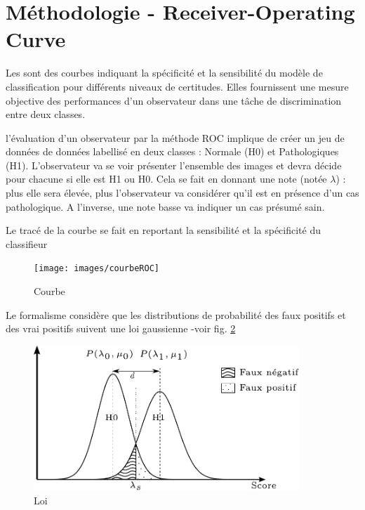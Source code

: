 	\section{Méthodologie \ROC - Receiver-Operating Curve}

Les \ROC sont des courbes indiquant la spécificité et la sensibilité du modèle de classification pour différents niveaux de certitudes. Elles fournissent une mesure objective des performances d'un observateur dans une tâche de discrimination entre deux classes. 

l'évaluation d'un observateur par la méthode ROC implique de créer un jeu de données de données labellisé en deux classes : Normale (H0) et Pathologiques (H1). L'observateur va se voir présenter l'ensemble des images et devra décide pour chacune si elle est H1 ou H0. Cela se fait en donnant une note (notée $\lambda$) : plus elle sera élevée, plus l'observateur va considérer qu'il est en présence d'un cas pathologique. A l'inverse, une note basse va indiquer un cas présumé sain.

Le tracé de la courbe \ROC se fait en reportant la sensibilité et la spécificité du classifieur 
\begin{figure}[h]
	
	\label{fig:courbeROC}
	\begin{center}
	\texttt{[image: images/courbeROC]}
	\end{center}
	\caption{Courbe \ROC}
\end{figure}

Le formalisme \ROC considère que les distributions de probabilité des faux positifs et des vrai positifs suivent une loi gaussienne -voir fig. \ref{fig:loiROC}

\begin{figure}[h]
	
	\label{fig:loiROC}
	\begin{center}
	\includegraphics[width=10cm]{images/loiROC}
	\end{center}
	\caption{Loi \ROC}
\end{figure}

